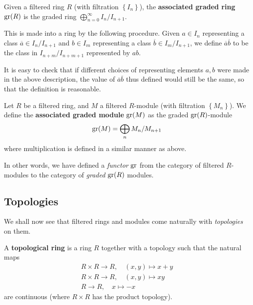 \begin{definition} Given a filtered ring $R$ (with filtration
$\left\{I_n\right\}$), the
\textbf{associated graded ring} $\operatorname{gr}(R)$ is the graded ring $\bigoplus_{n=0}^\infty I_n /I_{n+1}$.

This is made into a ring by the following procedure. Given $a \in I_n$
representing a class $\overline{a} \in I_n/I_{n+1}$ and $b \in I_m$
representing a class $\overline{b} \in I_m/I_{n+1}$, we define
$\overline{a}\overline{b} $ to be the class in $I_{n+m}/I_{n+m+1}$ represented
by $ab$. 
\end{definition}

It is easy to check that if different choices of representing elements $a,b$ were made in the above
description, the value of $\overline{a}\overline{b}$ thus defined would still
be the same, so that the definition is reasonable.


\begin{definition} 
Let $R$ be a filtered ring, and $M$ a filtered $R$-module (with filtration
$\left\{M_n\right\}$). We define the \textbf{associated graded module}
$\operatorname{gr}(M)$ as the graded $\operatorname{gr}(R)$-module
\[ \operatorname{gr}(M) = \bigoplus_{n} M_n/M_{n+1}  \]
where multiplication is defined in a similar manner as above.
\end{definition} 

In other words, we have defined a \emph{functor} $\operatorname{gr}$ from the category of filtered
$R$-modules to the category of \emph{graded} $\operatorname{gr}(R)$ modules.
\subsection{Topologies}

We shall now see that filtered rings and modules come naturally with
\emph{topologies} on them. 

\begin{definition} 
A \textbf{topological ring} is a ring $R$ together with a topology such that
the natural maps
\begin{gather*} R \times R \to R, \quad  (x,y) \mapsto x+y \\
R \times R \to R, \quad (x,y) \mapsto xy \\
R \to R, \quad x \mapsto -x
\end{gather*}
are continuous (where $R \times R$ has the product topology).
\end{definition} 




